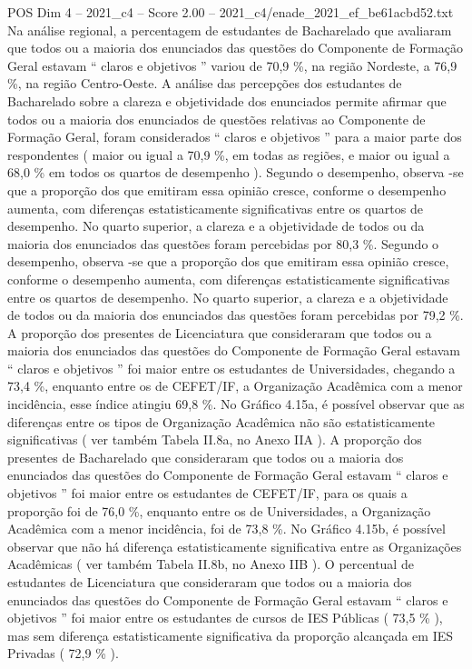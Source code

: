 \begin{textsample}{POS Dim 4 – 2021\_c4 – Score 2.00 – 2021\_c4/enade\_2021\_ef\_be61acbd52.txt}
Na análise regional, a percentagem de estudantes de Bacharelado que avaliaram que todos ou a maioria dos enunciados das questões do Componente de Formação Geral estavam “ claros e objetivos ” variou de 70,9 \%, na região Nordeste, a 76,9 \%, na região Centro-Oeste.
A análise das percepções dos estudantes de Bacharelado sobre a clareza e objetividade dos enunciados permite afirmar que todos ou a maioria dos enunciados de questões relativas ao Componente de Formação Geral, foram considerados “ claros e objetivos ” para a maior parte dos respondentes ( maior ou igual a 70,9 \%, em todas as regiões, e maior ou igual a 68,0 \% em todos os quartos de desempenho ).
Segundo o desempenho, observa -se que a proporção dos que emitiram essa opinião cresce, conforme o desempenho aumenta, com diferenças estatisticamente significativas entre os quartos de desempenho.
No quarto superior, a clareza e a objetividade de todos ou da maioria dos enunciados das questões foram percebidas por 80,3 \%.
Segundo o desempenho, observa -se que a proporção dos que emitiram essa opinião cresce, conforme o desempenho aumenta, com diferenças estatisticamente significativas entre os quartos de desempenho.
No quarto superior, a clareza e a objetividade de todos ou da maioria dos enunciados das questões foram percebidas por 79,2 \%.
A proporção dos presentes de Licenciatura que consideraram que todos ou a maioria dos enunciados das questões do Componente de Formação Geral estavam “ claros e objetivos ” foi maior entre os estudantes de Universidades, chegando a 73,4 \%, enquanto entre os de CEFET/IF, a Organização Acadêmica com a menor incidência, esse índice atingiu 69,8 \%.
No Gráfico 4.15a, é possível observar que as diferenças entre os tipos de Organização Acadêmica não são estatisticamente significativas ( ver também Tabela II.8a, no Anexo IIA ).
A proporção dos presentes de Bacharelado que consideraram que todos ou a maioria dos enunciados das questões do Componente de Formação Geral estavam “ claros e objetivos ” foi maior entre os estudantes de CEFET/IF, para os quais a proporção foi de 76,0 \%, enquanto entre os de Universidades, a Organização Acadêmica com a menor incidência, foi de 73,8 \%.
No Gráfico 4.15b, é possível observar que não há diferença estatisticamente significativa entre as Organizações Acadêmicas ( ver também Tabela II.8b, no Anexo IIB ).
O percentual de estudantes de Licenciatura que consideraram que todos ou a maioria dos enunciados das questões do Componente de Formação Geral estavam “ claros e objetivos ” foi maior entre os estudantes de cursos de IES Públicas ( 73,5 \% ), mas sem diferença estatisticamente significativa da proporção alcançada em IES Privadas ( 72,9 \% ).

\end{textsample}
